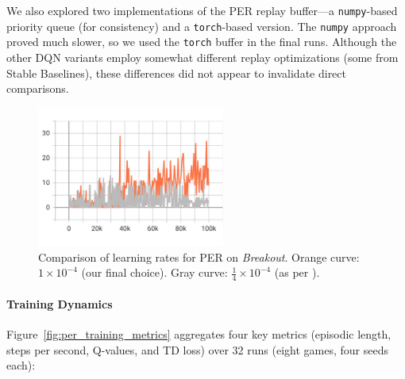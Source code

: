 We also explored two implementations of the PER replay buffer—a \texttt{numpy}-based priority queue (for consistency) and a \texttt{torch}-based version. The \texttt{numpy} approach proved much slower, so we used the \texttt{torch} buffer in the final runs. Although the other DQN variants employ somewhat different replay optimizations (some from Stable Baselines), these differences did not appear to invalidate direct comparisons.

\begin{figure}
	\centering
	\includegraphics[width=0.55\textwidth]{figures/per/per_lr_charts_episodic_return.jpeg}
	\caption{Comparison of learning rates for PER on \emph{Breakout}. 
		Orange curve: $1\times10^{-4}$ (our final choice). 
		Gray curve: $\tfrac{1}{4}\times10^{-4}$ (as per \cite{schaul:prioritized}).}
	\label{fig:per_lr_comparison}
\end{figure}

\paragraph{Training Dynamics}
Figure~\ref{fig:per_training_metrics} aggregates four key metrics (episodic length, steps per second, Q-values, and TD loss) over 32 runs (eight games, four seeds each):

